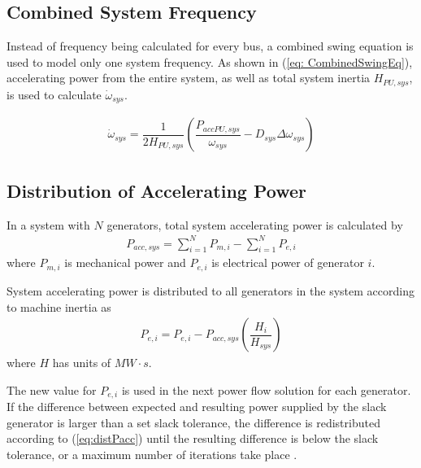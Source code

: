 \subsection{Combined System Frequency}
Instead of frequency being calculated for every bus, a combined swing equation is used to model only one system frequency.
As shown in (\ref{eq: CombinedSwingEq}), accelerating power from the entire system, as well as total system inertia $H_{PU, sys}$, is used to calculate $\dot{\omega}_{sys}$.

\begin{align}
\dot{\omega}_{sys} = \dfrac{1}{2H_{PU, sys} } \left( \dfrac{P_{acc PU, sys} }{\omega_{sys}} - D_{sys}\Delta\omega_{sys}  \right) \label{eq: CombinedSwingEq}
\end{align} 

\subsection{Distribution of Accelerating Power}
In a system with $N$ generators, total system accelerating power is calculated by
\begin{align}
P_{acc, sys} = \sum_{i=1}^{N} P_{m,i}  - \sum_{i=1}^{N} P_{e,i} \label{eq:Pacc} 
\end{align}
\noindent where $P_{m,i}$ is mechanical power and $P_{e,i}$ is electrical power of generator $i$.

System accelerating power is distributed to all generators in the system according to machine inertia as
\begin{align}
P_{e, i} = P_{e, i}  - P_{acc, sys}\left( \dfrac{H_i}{H_{sys}}\right) \label{eq:distPacc}
\end{align}
where $H$ has units of $MW\cdot s$.

The new value for $P_{e, i}$ is used in the next power flow solution for each generator.
If the difference between expected and resulting power supplied by the slack generator is larger than a set slack tolerance, the difference is redistributed according to (\ref{eq:distPacc}) until the resulting difference is below the slack tolerance, or a maximum number of iterations take place \cite{Stajcar}.
